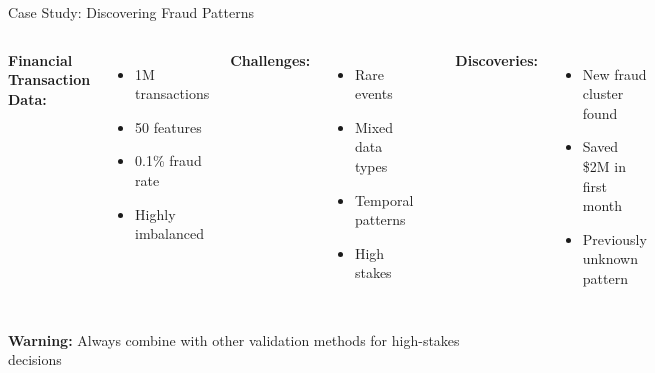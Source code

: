\documentclass[aspectratio=169]{beamer}
\newcommand{\warning}[1]{\colorbox{red!10}{\textcolor{warningcolor}{\textbf{Warning:} #1}}}
\begin{document}
\begin{frame}{Case Study: Discovering Fraud Patterns}
\begin{columns}
\textbf{Financial Transaction Data:}
\begin{itemize}
\item 1M transactions
\item 50 features
\item 0.1\% fraud rate
\item Highly imbalanced
\end{itemize}

\textbf{Challenges:}
\begin{itemize}
\item Rare events
\item Mixed data types
\item Temporal patterns
\item High stakes
\end{itemize}

\includegraphics[width=\textwidth]{./Figures/fraud_detection_tsne.png}

\textbf{Discoveries:}
\begin{itemize}
\item New fraud cluster found
\item Saved \$2M in first month
\item Previously unknown pattern
\end{itemize}
\end{columns}

\warning{Always combine with other validation methods for high-stakes decisions}
\end{frame}
\end{document}
